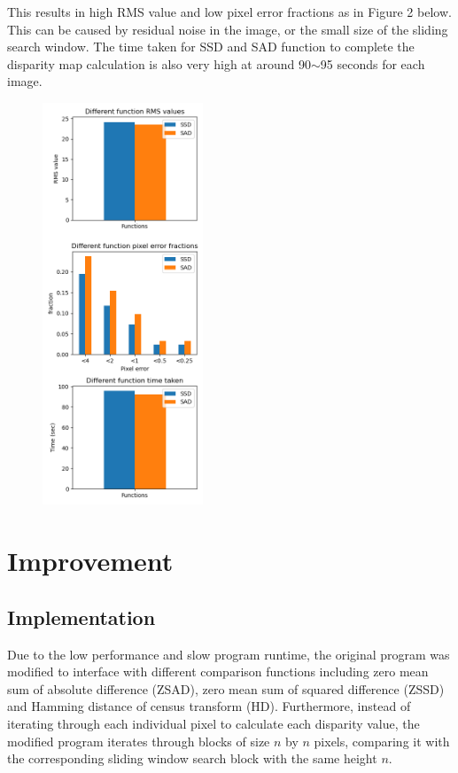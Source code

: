 \documentclass[conference]{IEEEtran}
\begin{document}
This results in high RMS value and low pixel error fractions as in Figure 2 below. This can be caused by residual noise in the image, or the small size of the sliding search window. The time taken for SSD and SAD function to complete the disparity map calculation is also very high at around 90\(\sim \)95 seconds for each image.

\begin{figure}[H]
    \centering
    \includegraphics[height=12cm]{702_stats_1_25.png}
\end{figure}

\section{Improvement}

\subsection{Implementation}

Due to the low performance and slow program runtime, the original program was modified to interface with different comparison functions including zero mean sum of absolute difference (ZSAD), zero mean sum of squared difference (ZSSD) and Hamming distance of census transform (HD). Furthermore, instead of iterating through each individual pixel to calculate each disparity value, the modified program iterates through blocks of size $n$ by $n$ pixels, comparing it with the corresponding sliding window search block with the same height $n$. 
\end{document}

